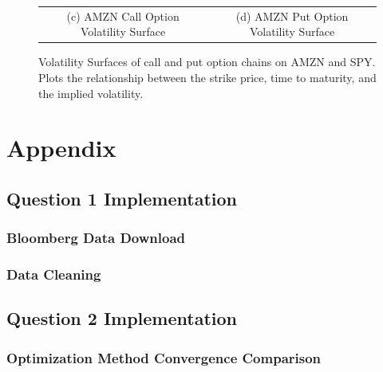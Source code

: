\documentclass[10pt]{article}
\newcommand*\lstinputpath[1]{\lstset{inputpath=#1}} %
\begin{document}
\begin{figure}
\begin{tabular}{cc}
                (c) AMZN Call Option Volatility Surface &
                (d) AMZN Put Option Volatility Surface
            \end{tabular}
            \label{fig:volatility_surfaces}
            \caption{Volatility Surfaces of call and put option chains on AMZN and SPY. Plots the relationship between the strike price, time to maturity, and the implied volatility.}
        \end{figure}


\newpage

\printbibliography



\newpage

\appendix

\lstinputpath{}

\section{Appendix} \label{appendix:source}

    \subsection{Question 1 Implementation}

        \subsubsection{Bloomberg Data Download} \label{appendix:source:q1:bloomberg}
            
        
        \subsubsection{Data Cleaning} \label{appendix:source:q1:clean}
            
    
    \newpage
    \subsection{Question 2 Implementation}
        
        \subsubsection{Optimization Method Convergence Comparison} \label{appendix:source:q2:convergence}
            
\end{document}
